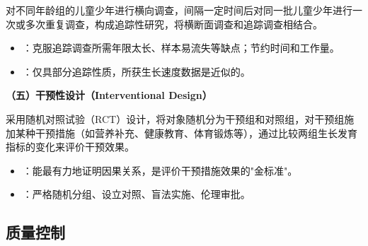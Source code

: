 \begin{keybox}
对不同年龄组的儿童少年进行横向调查，间隔一定时间后对同一批儿童少年进行一次或多次重复调查，构成追踪性研究，将横断面调查和追踪调查相结合。

\begin{itemize}[leftmargin=*]
    \item {}：克服追踪调查所需年限太长、样本易流失等缺点；节约时间和工作量。
    \item {}：仅具部分追踪性质，所获生长速度数据是近似的。
\end{itemize}

\textbf{（五）干预性设计（Interventional Design）}

采用随机对照试验（RCT）设计，将对象随机分为干预组和对照组，对干预组施加某种干预措施（如营养补充、健康教育、体育锻炼等），通过比较两组生长发育指标的变化来评价干预效果。

\begin{itemize}[leftmargin=*]
    \item {}：能最有力地证明因果关系，是评价干预措施效果的"金标准"。
    \item {}：严格随机分组、设立对照、盲法实施、伦理审批。
\end{itemize}
\end{keybox}

\subsection{质量控制}


